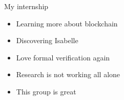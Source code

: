 \documentclass{beamer}
\begin{document}
\begin{frame}{My internship}
		\begin{itemize}
		\item Learning more about blockchain
		\item<2-> Discovering Isabelle
		\item<3-> Love formal verification again
		\item<4-> Research is not working all alone
		\item<5-> \alert<5>{This group is great}
	\end{itemize}
\end{frame}




\end{document}
